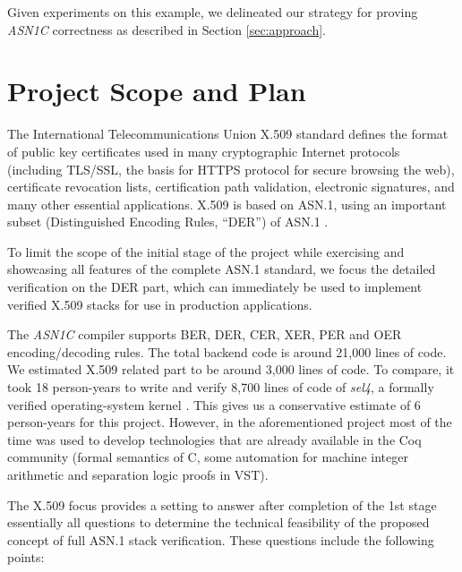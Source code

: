 \documentclass[10p,conference]{IEEEtran}
\begin{document}
Given experiments on this example, we delineated our strategy for proving
\emph{ASN1C} correctness as described in Section \ref{sec:approach}.

\section{Project Scope and Plan}

The International Telecommunications Union X.509 standard
\cite{X509} defines the format of public key certificates used in
many cryptographic Internet protocols (including TLS/SSL, the basis
for HTTPS protocol for secure browsing the web), certificate
revocation lists, certification path validation, electronic
signatures, and many other essential applications. X.509 is based on
ASN.1, using an important subset (Distinguished
Encoding Rules, ``DER'') of ASN.1 \cite{ASN1StandardBER} \cite{BERandDER}.

To limit the scope of the initial stage of the project while
exercising and showcasing all features of the complete ASN.1
standard, we focus the detailed verification on the DER part,
which can immediately be used to implement verified X.509
stacks for use in production applications.

The \emph{ASN1C} compiler supports BER, DER, CER, XER, PER and OER encoding/decoding rules. The total backend code is around 21,000 lines of code. We estimated X.509 related part to be around 3,000 lines of code. To compare, it took 18 person-years to write and verify 8,700 lines of code of \emph{sel4}, a formally verified operating-system kernel \cite{SEL4}. This gives us a conservative estimate of 6 person-years for this project. However, in the aforementioned project most of the time was used to develop technologies that are already available in the Coq community (formal semantics of C, some automation for machine integer arithmetic and separation logic proofs in VST). 

The X.509 focus provides a setting to answer after completion of the
1st stage essentially all questions
to determine the technical feasibility of the
proposed concept of full ASN.1 stack verification. These questions
include the following points:
\end{document}
